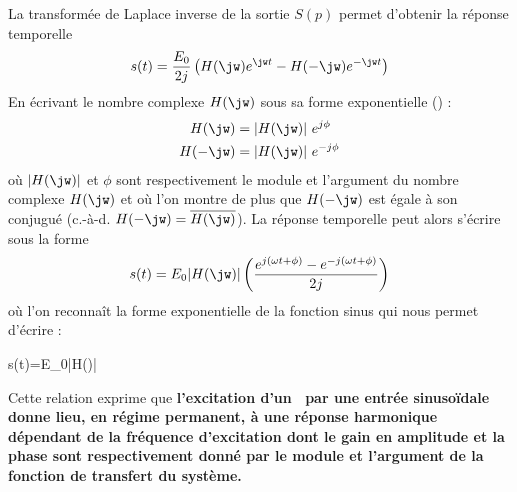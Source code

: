 La transformée de Laplace inverse de la sortie $S(p)$ permet d'obtenir la 
réponse temporelle 
\[
s(t)=\dfrac{E_0}{2j}\left(H(\jw)e^{\jw t}-H(-\jw)e^{-\jw t}\right)
\]
En écrivant le nombre complexe $H(\jw)$ sous sa forme exponentielle 
() :
\begin{align*}
    H(\jw)  &= |H(\jw)| e^{j\phi} \\
    H(-\jw) &= |H(\jw)| e^{-j\phi}
\end{align*}
où $|H(\jw)|$ et $\phi$ sont respectivement le module et l'argument du nombre
complexe $H(\jw)$ 
et où l'on montre de plus que $H(-\jw)$ est égale à son conjugué (c.-à-d. 
$H(-\jw)=\overline{H(\jw)}$).
%
%
%
%
La réponse temporelle peut alors s'écrire sous la forme 
\begin{align*}
s(t)=E_0|H(\jw)|\left(\dfrac{e^{j(\omega t+\phi)}
    -e^{-j(\omega t+\phi)}}{2j}\right)
\end{align*}
où l'on reconnaît la forme exponentielle de la fonction sinus qui nous permet
d'écrire :
\begin{bequation}
    s(t)=E_0|H(\jw)|\label{eq-rh}
\end{bequation}
Cette relation exprime que \textbf{l'excitation d'un {}
~par une entrée sinuso\"idale donne lieu, en régime permanent, à une réponse 
harmonique dépendant de la fréquence d'excitation dont le gain en amplitude et
la phase sont respectivement donné par le module et l'argument de la fonction
de transfert du système.}


